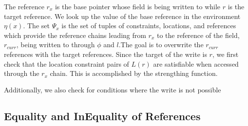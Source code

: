 The reference $r_x$ is the base pointer whose field is being written
to while $r$ is the target reference. We look up the value of the base
reference in the environment $\eta(x)$. The set $\Psi_x$ is the set of
tuples of constraints, locations, and references which provide the
reference chains leading from $r_x$ to the reference of the field,
$r_\mathit{curr}$, being written to through $\phi$ and $l$.The goal is
to overwrite the $r_\mathit{curr}$ references with the target
references. Since the target of the write is $r$, we first check that the
location constraint pairs of $L(r)$ are satisfiable when accessed
through the $r_x$ chain. This is accomplished by the strengthing
function.



Additionally, we also check for conditions where the write is not possible 

\begin{comment}
\begin{figure}[t]
\begin{center}
\begin{tabular}[c]{l}
$\Psi_x = \{ (true, l_0, r_1^i) \}$\\
$ST (L, r_3^s, \phi, \phi_g)$ \\
$\theta = \{ (\phi_{2a}\; l_\mathit{null} ) (\phi_{2b}\; l_2) (\phi_{2c}\; l_1) \}$\\
$ST(L, r_0, \phi, \phi_g)$\\
$\theta = \{ \}$\\
\end{tabular}
\end{center}
\caption{field write for this.x = this.y sets}
\label{fig:faHeapSets}
\end{figure}
\end{comment}

\subsection{Equality and InEquality of References}




